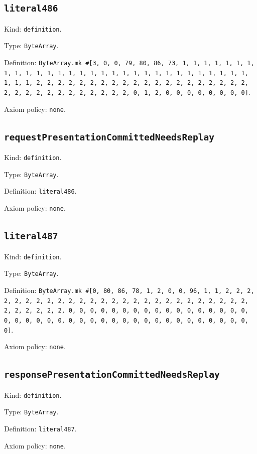 \documentclass[11pt]{article}
\begin{document}
\subsection*{\texttt{literal486}}
\noindent Kind: \texttt{definition}.\par
\noindent Type: \texttt{ByteArray}.\par
\noindent Definition: \texttt{ByteArray.mk \#[3, 0, 0, 79, 80, 86, 73, 1, 1, 1, 1, 1, 1, 1, 1, 1, 1, 1, 1, 1, 1, 1, 1, 1, 1, 1, 1, 1, 1, 1, 1, 1, 1, 1, 1, 1, 1, 1, 1, 1, 2, 2, 2, 2, 2, 2, 2, 2, 2, 2, 2, 2, 2, 2, 2, 2, 2, 2, 2, 2, 2, 2, 2, 2, 2, 2, 2, 2, 2, 2, 2, 2, 0, 1, 2, 0, 0, 0, 0, 0, 0, 0, 0]}.\par
\noindent Axiom policy: \texttt{none}.\par
\subsection*{\texttt{requestPresentationCommittedNeedsReplay}}
\noindent Kind: \texttt{definition}.\par
\noindent Type: \texttt{ByteArray}.\par
\noindent Definition: \texttt{literal486}.\par
\noindent Axiom policy: \texttt{none}.\par
\subsection*{\texttt{literal487}}
\noindent Kind: \texttt{definition}.\par
\noindent Type: \texttt{ByteArray}.\par
\noindent Definition: \texttt{ByteArray.mk \#[0, 80, 86, 78, 1, 2, 0, 0, 96, 1, 1, 2, 2, 2, 2, 2, 2, 2, 2, 2, 2, 2, 2, 2, 2, 2, 2, 2, 2, 2, 2, 2, 2, 2, 2, 2, 2, 2, 2, 2, 2, 2, 2, 0, 0, 0, 0, 0, 0, 0, 0, 0, 0, 0, 0, 0, 0, 0, 0, 0, 0, 0, 0, 0, 0, 0, 0, 0, 0, 0, 0, 0, 0, 0, 0, 0, 0, 0, 0, 0, 0, 0, 0, 0]}.\par
\noindent Axiom policy: \texttt{none}.\par
\subsection*{\texttt{responsePresentationCommittedNeedsReplay}}
\noindent Kind: \texttt{definition}.\par
\noindent Type: \texttt{ByteArray}.\par
\noindent Definition: \texttt{literal487}.\par
\noindent Axiom policy: \texttt{none}.\par
\end{document}
